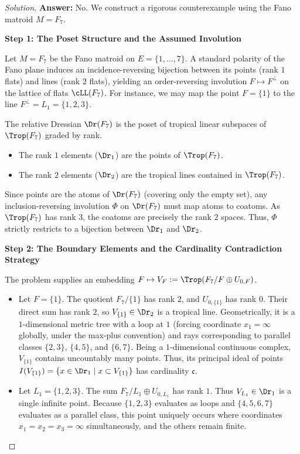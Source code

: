 \begin{proof}[Solution]
\textbf{Answer:} No. We construct a rigorous counterexample using the Fano matroid $M = F_7$.

\medskip
\noindent \textbf{Step 1: The Poset Structure and the Assumed Involution}

Let $M = F_7$ be the Fano matroid on $E = \{1, \dots, 7\}$. A standard polarity of the Fano plane induces an incidence-reversing bijection between its points (rank $1$ flats) and lines (rank $2$ flats), yielding an order-reversing involution $F \mapsto F^\perp$ on the lattice of flats $\cLL(F_7)$. For instance, we may map the point $F = \{1\}$ to the line $F^\perp = L_1 = \{1,2,3\}$.

The relative Dressian $\Dr(F_7)$ is the poset of tropical linear subspaces of $\Trop(F_7)$ graded by rank. 
\begin{itemize}
    \item The rank $1$ elements ($\Dr_1$) are the points of $\Trop(F_7)$.
    \item The rank $2$ elements ($\Dr_2$) are the tropical lines contained in $\Trop(F_7)$.
\end{itemize}
Since points are the atoms of $\Dr(F_7)$ (covering only the empty set), any inclusion-reversing involution $\Phi$ on $\Dr(F_7)$ must map atoms to coatoms. As $\Trop(F_7)$ has rank $3$, the coatoms are precisely the rank $2$ spaces. Thus, $\Phi$ strictly restricts to a bijection between $\Dr_1$ and $\Dr_2$.

\medskip
\noindent \textbf{Step 2: The Boundary Elements and the Cardinality Contradiction Strategy}

The problem supplies an embedding $F \mapsto V_F := \Trop(F_7/F \oplus U_{0,F})$.
\begin{itemize}
    \item Let $F = \{1\}$. The quotient $F_7/\{1\}$ has rank $2$, and $U_{0,\{1\}}$ has rank $0$. Their direct sum has rank $2$, so $V_{\{1\}} \in \Dr_2$ is a tropical line. Geometrically, it is a $1$-dimensional metric tree with a loop at $1$ (forcing coordinate $x_1 = \infty$ globally, under the max-plus convention) and rays corresponding to parallel classes $\{2,3\}$, $\{4,5\}$, and $\{6,7\}$. Being a $1$-dimensional continuous complex, $V_{\{1\}}$ contains uncountably many points. Thus, its principal ideal of points $I(V_{\{1\}}) = \{ x \in \Dr_1 \mid x \subset V_{\{1\}} \}$ has cardinality $\mathfrak{c}$.
    \item Let $L_1 = \{1,2,3\}$. The sum $F_7/L_1 \oplus U_{0,L_1}$ has rank $1$. Thus $V_{L_1} \in \Dr_1$ is a single infinite point. Because $\{1,2,3\}$ evaluates as loops and $\{4,5,6,7\}$ evaluates as a parallel class, this point uniquely occurs where coordinates $x_1 = x_2 = x_3 = \infty$ simultaneously, and the others remain finite.
\end{itemize}


\end{proof}
